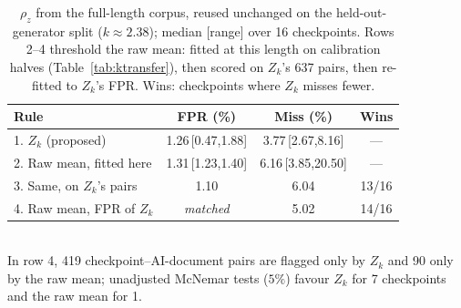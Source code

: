 \begin{table}[t]
\caption{$\rho_z$ from the full-length corpus, reused unchanged on the
held-out-generator split ($k{\approx}2.38$); median [range] over 16 checkpoints.
Rows 2--4 threshold the raw mean: fitted at this length on calibration halves
(Table~\ref{tab:ktransfer}), then scored on $Z_k$'s 637 pairs, then re-fitted to
$Z_k$'s FPR. Wins: checkpoints where $Z_k$ misses fewer.}
\label{tab:ood}
\centering
\scriptsize
\setlength{\tabcolsep}{3pt}
\begin{tabular}{@{}lccc@{}}
\toprule
Rule & FPR (\%) & Miss (\%) & Wins \\
\midrule
1. $Z_k$ (proposed) & 1.26\,[0.47,1.88] & 3.77\,[2.67,8.16] & --- \\
\midrule
2. Raw mean, fitted here & 1.31\,[1.23,1.40] & 6.16\,[3.85,20.50] & --- \\
3. Same, on $Z_k$'s pairs & 1.10 & 6.04 & 13/16 \\
4. Raw mean, FPR of $Z_k$ & \emph{matched} & 5.02 & 14/16 \\
\bottomrule
\end{tabular}
\\[2pt]\footnotesize In row 4, 419 checkpoint--AI-document pairs are flagged only
by $Z_k$ and 90 only by the raw mean; unadjusted McNemar tests ($5\%$) favour
$Z_k$ for 7 checkpoints and the raw mean for 1.
\end{table}
